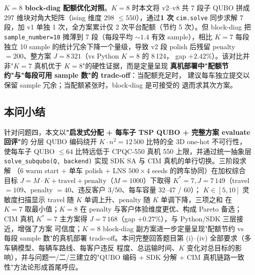 \documentclass[UTF8,12pt,a4paper]{ctexart}
\begin{document}
\textbf{$K\!=\!8$ block-diag 配额优化对照}。$K=8$ 时本文将 v2--v8 共 7 段子 QUBO
拼成 297 维块对角大矩阵（ising 维度 298 $\le 550$），通过\textbf{1 次}
\texttt{cim.solve} 同步求解 7 段，加 v1 单独 1 次，全方案累计仅 2 次平台配额（节约
5 次）。但 block-diag 把 \texttt{sample\_number=10} 摊薄到 7 段（每段平均 $\sim\!1.4$
有效 sample），相比 $K=7$ 每段独立 10 sample 的统计冗余下降一个量级，导致 v2 段
polish 后残留 penalty $=200$、整方案 $J=8\,321$（vs Python $K=8$ 的 8\,124，
gap $+2.42\%$）。该对比并非"$K=7$ 真机优于 $K=8$"的硬性证据，而是定量呈现
\textbf{真机部署中"配额节约"与"每段可用 sample 数"的 trade-off}：当配额充足时，
建议每车独立提交以保留 sample 冗余；当配额紧张时，block-diag 是可接受的
退而求其次方案。

\subsection{本问小结}
\label{subsec:q4-summary}

针对问题四，本文以\textbf{"启发式分配 + 每车子 TSP QUBO + 完整方案 evaluate 回评"}的
分层 QUBO 编码绕开 $K\!\cdot\!n^{2}=12\,500$ 比特的全 3D one-hot 不可行性，使每车子 QUBO
$\le 64$ 比特远低于 CPQC-550 真机 550 上限，并通过统一抽象层
\texttt{solve\_subqubo(Q, backend)} 实现 SDK SA 与 CIM 真机的单行切换。三阶段求解
（6 warm start + 单车 polish + LNS $500\!\times\!4$ seeds 的跨车协同）在加权综合目标
$J=M\!\cdot\!K+\mathrm{travel}+\mathrm{penalty}$（$M=1000$）下取得
$K^*=7,J=7\,149$（travel $=109$、penalty $=40$、违反客户 $3/50$、每车容量 32--47 / 60）；
$K\in[5,10]$ 灵敏度扫描显示 travel 随 $K$ 单调上升、penalty 随 $K$ 单调下降，三项之和
在 $K=7$ 取最小值；$K=8$ 在 penalty 与客户体验维度更优、构成 Pareto 备选；CIM 真机
$K^*\!=\!7$ 主方案得 $J=7\,168$（gap $+0.27\%$），与 Python/SDK 三层接近，增强了方案
可信度；$K=8$ block-diag 副方案进一步定量呈现"配额节约 vs 每段 sample 数"的真机部署
trade-off。本问完整回答题目第 (i)--(iv) 全部要求（多车辆模型、每辆车路线、每客户违反
程度、总运输时间、$K$ 变化对总目标的影响），并与问题一/二/三建立的"QUBO 编码 +
SDK 分解 + CIM 真机链路一致性"方法论形成首尾呼应。
\end{document}
